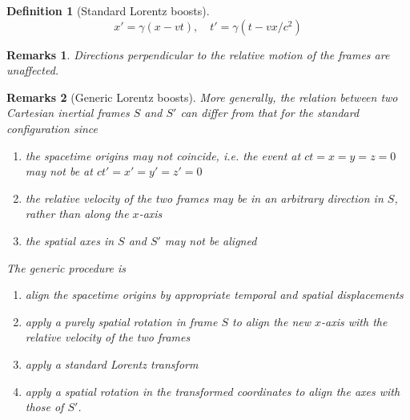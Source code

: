 \documentclass[a4paper]{article}
\newtheorem{remarks}{Remarks}[section]
\theoremstyle{new}
\newtheorem{defi}{Definition}[section]
\begin{document}
\begin{defi}[Standard Lorentz boosts]
\begin{equation}
x'=\gamma(x-vt),\quad t'=\gamma(t-vx/c^2)\label{boost}
\end{equation}
\end{defi}
\begin{remarks}
Directions perpendicular to the relative motion of the frames are unaffected.
\end{remarks}
\begin{remarks}[Generic Lorentz boosts]
More generally, the relation between two Cartesian inertial frames $S$ and $S'$ can differ from that for the standard configuration since
\begin{enumerate}
    \item the spacetime origins may not coincide, i.e. the event at $ct=x=y=z=0$ may not be at $ct'=x'=y'=z'=0$
    \item the relative velocity of the two frames may be in an arbitrary direction in $S$, rather than along the $x$-axis
    \item the spatial axes in $S$ and $S'$ may not be aligned
\end{enumerate}
The generic procedure is
\begin{enumerate}
    \item align the spacetime origins by appropriate temporal and spatial displacements
    \item apply a purely spatial rotation in frame $S$ to align the new $x$-axis with the relative velocity of the two frames
    \item apply a standard Lorentz transform
    \item apply a spatial rotation in the transformed coordinates to align the axes with those of $S'$.
\end{enumerate}
\end{remarks}
\newpage
\end{document}

